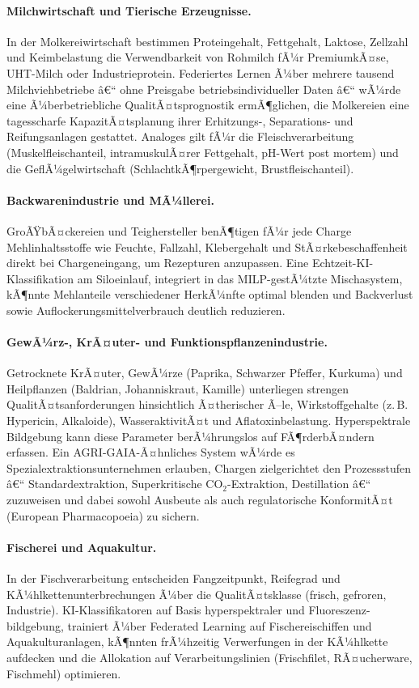 ﻿\documentclass[12pt,a4paper]{article}
\theoremstyle{plain}
\theoremstyle{definition}
\begin{document}
	\paragraph{Milchwirtschaft und Tierische Erzeugnisse.}
	In der Molkereiwirtschaft bestimmen Proteingehalt, Fettgehalt, Laktose,
	Zellzahl und Keimbelastung die Verwendbarkeit von Rohmilch fÃ¼r
	PremiumkÃ¤se, UHT-Milch oder Industrieprotein. Federiertes Lernen Ã¼ber
	mehrere tausend Milchviehbetriebe â€“ ohne Preisgabe betriebsindividueller
	Daten â€“ wÃ¼rde eine Ã¼berbetriebliche QualitÃ¤tsprognostik ermÃ¶glichen,
	die Molkereien eine tagesscharfe KapazitÃ¤tsplanung ihrer Erhitzungs-,
	Separations- und Reifungsanlagen gestattet. Analoges gilt fÃ¼r die
	Fleischverarbeitung (Muskelfleischanteil, intramuskulÃ¤rer Fettgehalt,
	pH-Wert post mortem) und die GeflÃ¼gelwirtschaft (SchlachtkÃ¶rpergewicht,
	Brustfleischanteil).

	\paragraph{Backwarenindustrie und MÃ¼llerei.}
	GroÃŸbÃ¤ckereien und Teighersteller benÃ¶tigen fÃ¼r jede Charge
	Mehlinhaltsstoffe wie Feuchte, Fallzahl, Klebergehalt und
	StÃ¤rkebeschaffenheit direkt bei Chargeneingang, um Rezepturen anzupassen.
	Eine Echtzeit-KI-Klassifikation am Siloeinlauf, integriert in das
	MILP-gestÃ¼tzte Mischasystem, kÃ¶nnte Mehlanteile verschiedener HerkÃ¼nfte
	optimal blenden und Backverlust sowie Auflockerungsmittelverbrauch deutlich
	reduzieren.

	\paragraph{GewÃ¼rz-, KrÃ¤uter- und Funktionspflanzenindustrie.}
	Getrocknete KrÃ¤uter, GewÃ¼rze (Paprika, Schwarzer Pfeffer, Kurkuma) und
	Heilpflanzen (Baldrian, Johanniskraut, Kamille) unterliegen strengen
	QualitÃ¤tsanforderungen hinsichtlich Ã¤therischer Ã–le, Wirkstoffgehalte
	(z.\,B. Hypericin, Alkaloide), WasseraktivitÃ¤t und Aflatoxinbelastung.
	Hyperspektrale Bildgebung kann diese Parameter berÃ¼hrungslos auf
	FÃ¶rderbÃ¤ndern erfassen. Ein AGRI-GAIA-Ã¤hnliches System wÃ¼rde es
	Spezialextraktionsunternehmen erlauben, Chargen zielgerichtet den
	Prozessstufen â€“ Standardextraktion, Superkritische CO$_2$-Extraktion,
	Destillation â€“ zuzuweisen und dabei sowohl Ausbeute als auch regulatorische
	KonformitÃ¤t (European Pharmacopoeia) zu sichern.

	\paragraph{Fischerei und Aquakultur.}
	In der Fischverarbeitung entscheiden Fangzeitpunkt, Reifegrad und
	KÃ¼hlkettenunterbrechungen Ã¼ber die QualitÃ¤tsklasse (frisch, gefroren,
	Industrie). KI-Klassifikatoren auf Basis hyperspektraler und Fluoreszenz-
	bildgebung, trainiert Ã¼ber Federated Learning auf Fischereischiffen und
	Aquakulturanlagen, kÃ¶nnten frÃ¼hzeitig Verwerfungen in der
	KÃ¼hlkette aufdecken und die Allokation auf Verarbeitungslinien
	(Frischfilet, RÃ¤ucherware, Fischmehl) optimieren.
\end{document}
